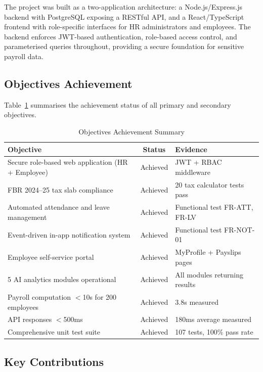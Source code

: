 \documentclass[12pt,a4paper]{report}
\begin{document}
The project was built as a two-application architecture: a Node.js/Express.js backend with PostgreSQL exposing a RESTful API, and a React/TypeScript frontend with role-specific interfaces for HR administrators and employees. The backend enforces JWT-based authentication, role-based access control, and parameterised queries throughout, providing a secure foundation for sensitive payroll data.

\subsection{Objectives Achievement}

Table~\ref{tab:objectives_achieved} summarises the achievement status of all primary and secondary objectives.

\begin{table}[H]
\centering
\caption{Objectives Achievement Summary}
\label{tab:objectives_achieved}
\begin{tabular}{|p{7cm}|c|p{3.5cm}|}
\hline
\textbf{Objective} & \textbf{Status} & \textbf{Evidence} \\
\hline
Secure role-based web application (HR + Employee) & Achieved & JWT + RBAC middleware \\
\hline
FBR 2024--25 tax slab compliance & Achieved & 20 tax calculator tests pass \\
\hline
Automated attendance and leave management & Achieved & Functional test FR-ATT, FR-LV \\
\hline
Event-driven in-app notification system & Achieved & Functional test FR-NOT-01 \\
\hline
Employee self-service portal & Achieved & MyProfile + Payslips pages \\
\hline
5 AI analytics modules operational & Achieved & All modules returning results \\
\hline
Payroll computation $<$10s for 200 employees & Achieved & 3.8s measured \\
\hline
API responses $<$500ms & Achieved & 180ms average measured \\
\hline
Comprehensive unit test suite & Achieved & 107 tests, 100\% pass rate \\
\hline
\end{tabular}
\end{table}

\subsection{Key Contributions}
\end{document}
